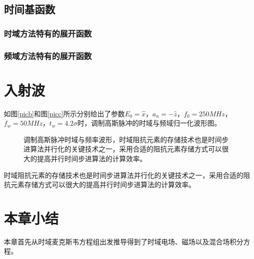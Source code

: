 \subsection{时间基函数}

\subsubsection{时域方法特有的展开函数}

\subsubsection{频域方法特有的展开函数}

\section{入射波}

如图\ref{picb}和图\ref{picc}所示分别给出了参数$E_0=\hat{x}$，$a_n=-\hat{z}$，$f_0=250MHz$，$f_w=50MHz$，$t_w=4.2\sigma$时，调制高斯脉冲的时域与频域归一化波形图。

\begin{figure}[h]
\caption{调制高斯脉冲时域与频率波形，时域阻抗元素的存储技术也是时间步进算法并行化的关键技术之一，采用合适的阻抗元素存储方式可以很大的提高并行时间步进算法的计算效率。}
\label{fig1}
\end{figure}

时域阻抗元素的存储技术也是时间步进算法并行化的关键技术之一，采用合适的阻抗元素存储方式可以很大的提高并行时间步进算法的计算效率。

\section{本章小结}
本章首先从时域麦克斯韦方程组出发推导得到了时域电场、磁场以及混合场积分方程。

